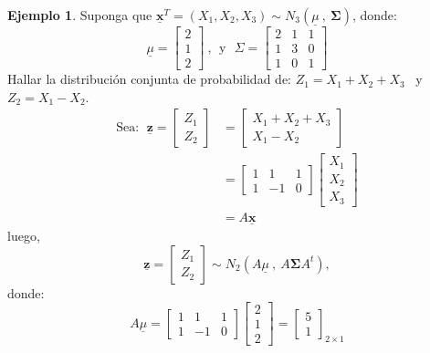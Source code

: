 \documentclass[
]{book}
\theoremstyle{definition}
\theoremstyle{definition}
\newtheorem{example}{Ejemplo}[chapter]
\theoremstyle{definition}
\theoremstyle{definition}
\theoremstyle{remark}
\begin{document}
\begin{example}
\protect\hypertarget{exm:ejemplo2-prop-3}{}\label{exm:ejemplo2-prop-3}Suponga que \(\underline{\mathbf{x}}^{T}=(X_1,X_2,X_3) \sim N_3(\underline{\mu} \ , \ \mathbf{\Sigma} )\),
donde:
\[
\underline{\mu}=\begin{bmatrix}
2 \\ 1\\ 2
\end{bmatrix} \ ,\ \ \text{y} \ \ \ \Sigma=\begin{bmatrix}
2 & 1 &1 \\
1 & 3 & 0 \\
1 & 0 & 1
\end{bmatrix}
\]
Hallar la distribución conjunta de probabilidad de: \(Z_1=X_1+X_2+X_3\) ~y ~~\(Z_2=X_1-X_2\).
\begin{align*}
\text{Sea}: \ \ \underline{\mathbf{z}}=\begin{bmatrix}
Z_1 \\ Z_2
\end{bmatrix}&=\begin{bmatrix}
X_1+X_2+X_3 \\ X_1-X_2
\end{bmatrix}\\
&=\begin{bmatrix}
1 & 1 &1 \\ 1 & -1 & 0
\end{bmatrix}\begin{bmatrix}
X_1 \\ X_2 \\ X_3
\end{bmatrix}\\
&=A\underline{\mathbf{x}}
\end{align*}
luego,
\[
\underline{\mathbf{z}}=\begin{bmatrix}
Z_1 \\ Z_2
\end{bmatrix} \sim N_2 (A \underline{\mu} \ , \ A\mathbf{\Sigma} A^t),
\]
donde:
\[
A\underline{\mu}= \begin{bmatrix}
1 & 1 &1 \\ 1 & -1 & 0
\end{bmatrix}\begin{bmatrix}
2 \\ 1\\ 2
\end{bmatrix}=\begin{bmatrix}
5 \\ 1
\end{bmatrix}_{2 \times 1}
\]
\end{example}
\end{document}
